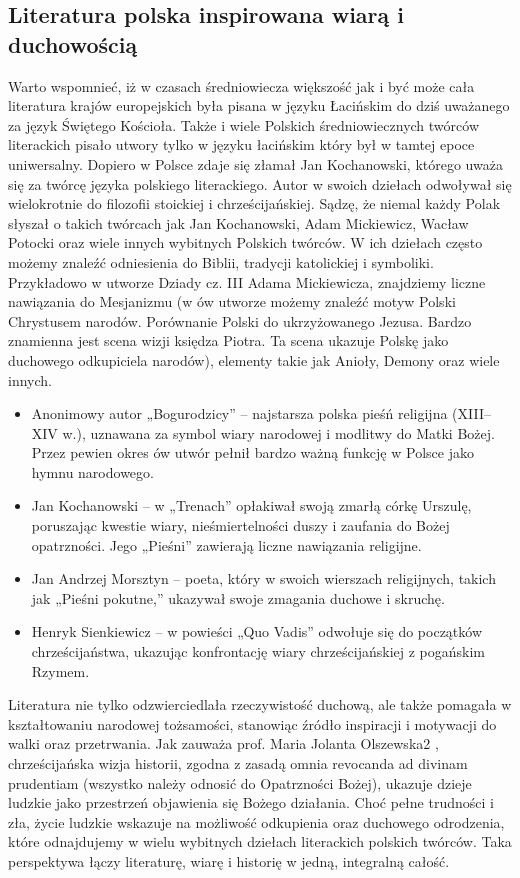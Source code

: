 \subsection{Literatura polska inspirowana wiarą i duchowością}

Warto wspomnieć, iż w czasach średniowiecza większość jak i być może cała literatura krajów europejskich była pisana w języku Łacińskim do dziś uważanego za język Świętego Kościoła. Także i wiele Polskich średniowiecznych twórców literackich pisało utwory tylko w języku łacińskim który był w tamtej epoce uniwersalny. Dopiero w Polsce zdaje się złamał Jan Kochanowski, którego uważa się za twórcę języka polskiego literackiego. Autor w swoich dziełach odwoływał się wielokrotnie do filozofii stoickiej i chrześcijańskiej. 
Sądzę, że niemal każdy Polak słyszał o takich twórcach jak Jan Kochanowski, Adam Mickiewicz, Wacław Potocki oraz wiele innych wybitnych Polskich twórców. W ich dziełach często możemy znaleźć odniesienia do Biblii, tradycji katolickiej i symboliki. Przykładowo w utworze Dziady cz. III Adama Mickiewicza, znajdziemy liczne nawiązania do Mesjanizmu (w ów utworze możemy znaleźć motyw Polski Chrystusem narodów. Porównanie Polski do ukrzyżowanego Jezusa. Bardzo znamienna jest scena wizji księdza Piotra. Ta scena ukazuje Polskę jako duchowego odkupiciela narodów), elementy takie jak Anioły, Demony oraz wiele innych.

\begin{itemize}
    \item Anonimowy autor „Bogurodzicy” – najstarsza polska pieśń religijna (XIII–XIV w.), uznawana za symbol wiary narodowej i modlitwy do Matki Bożej. Przez pewien okres ów utwór pełnił bardzo ważną funkcję w Polsce jako hymnu narodowego.
    \item Jan Kochanowski – w „Trenach” opłakiwał swoją zmarłą córkę Urszulę, poruszając kwestie wiary, nieśmiertelności duszy i zaufania do Bożej opatrzności. Jego „Pieśni” zawierają liczne nawiązania religijne.
    \item Jan Andrzej Morsztyn – poeta, który w swoich wierszach religijnych, takich jak „Pieśni pokutne,” ukazywał swoje zmagania duchowe i skruchę.
    \item Henryk Sienkiewicz – w powieści „Quo Vadis” odwołuje się do początków chrześcijaństwa, ukazując konfrontację wiary chrześcijańskiej z pogańskim Rzymem.


  \end{itemize}
  

Literatura nie tylko odzwierciedlała rzeczywistość duchową, ale także pomagała w
kształtowaniu narodowej tożsamości, stanowiąc źródło inspiracji i motywacji do walki
oraz przetrwania. Jak zauważa prof. Maria Jolanta Olszewska2
, chrześcijańska wizja
historii, zgodna z zasadą omnia revocanda ad divinam prudentiam (wszystko należy
odnosić do Opatrzności Bożej), ukazuje dzieje ludzkie jako przestrzeń objawienia się
Bożego działania. Choć pełne trudności i zła, życie ludzkie wskazuje na możliwość
odkupienia oraz duchowego odrodzenia, które odnajdujemy w wielu wybitnych
dziełach literackich polskich twórców. Taka perspektywa łączy literaturę, wiarę i
historię w jedną, integralną całość.

